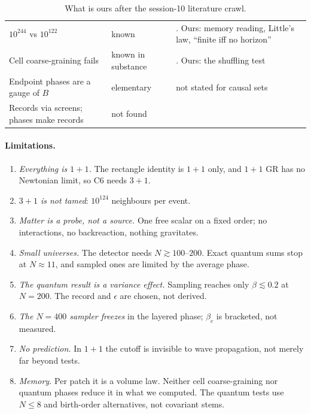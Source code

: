 \documentclass[11pt,a4paper]{article}
\begin{document}
\begin{table}[t]
\begin{tabular}{@{}>{\raggedright}p{}>{\raggedright}p{}>{\raggedright\arraybackslash}p{}@{}}
$10^{244}$ vs $10^{122}$ & known & \cite{Sorkin07L}. Ours: memory reading, Little's law, ``finite iff no horizon''\\
Cell coarse-graining fails & known in substance & \cite{Sorkin07}. Ours: the shuffling test\\
Endpoint phases are a gauge of $B$ & elementary & not stated for causal sets\\
Records via screens; phases make records & not found & \cite{Halliwell99,BoussoSusskind11}\\
\bottomrule
\end{tabular}
\caption{What is ours after the session-10 literature crawl.}
\label{tab:ours}
\end{table}

\paragraph{Limitations.}
\begin{enumerate}[leftmargin=*,itemsep=1pt]
\item \emph{Everything is $1+1$.} The rectangle identity is $1+1$ only, and $1+1$ GR has no Newtonian limit, so C6 needs $3+1$.
\item \emph{$3+1$ is not tamed}: $10^{124}$ neighbours per event.
\item \emph{Matter is a probe, not a source.} One free scalar on a fixed order; no interactions, no backreaction, nothing gravitates.
\item \emph{Small universes.} The detector needs $N\gtrsim100$--$200$. Exact quantum sums stop at $N\approx11$, and sampled ones are limited by the average phase.
\item \emph{The quantum result is a variance effect.} Sampling reaches only $\beta\lesssim0.2$ at $N=200$. The record and $\epsilon$ are chosen, not derived.
\item \emph{The $N=400$ sampler freezes} in the layered phase; $\beta_c$ is bracketed, not measured.
\item \emph{No prediction.} In $1+1$ the cutoff is invisible to wave propagation, not merely far beyond tests.
\item \emph{Memory.} Per patch it is a volume law. Neither cell coarse-graining nor quantum phases reduce it in what we computed. The quantum tests use $N\le8$ and birth-order alternatives, not covariant stems.
\end{enumerate}
\end{document}
